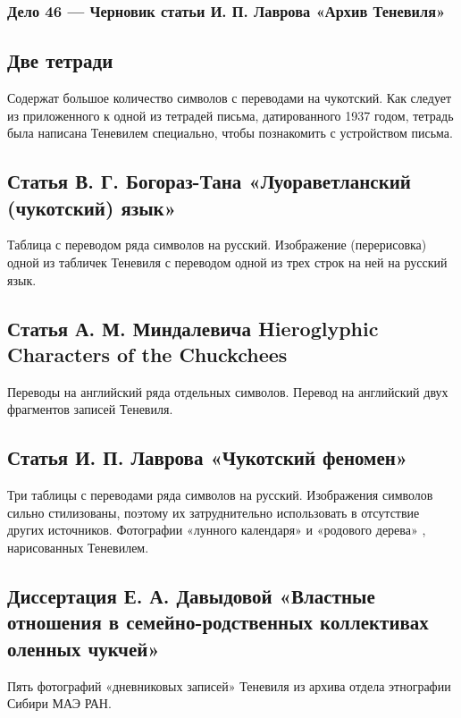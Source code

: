\documentclass{article}
\newcounter{glyph}
\def\allchars{}
\begin{document}
\subsubsection{Дело 46 — Черновик статьи И. П. Лаврова «Архив Теневиля» }

\subsection{Две тетради}

Содержат большое количество символов с переводами на чукотский. Как следует из приложенного к одной из тетрадей письма, датированного 1937 годом, тетрадь была написана Теневилем специально, чтобы познакомить с устройством письма. 

\subsection{Статья В. Г. Богораз-Тана «Луораветланский (чукотский) язык»}

Таблица с переводом ряда символов на русский. Изображение (перерисовка) одной из табличек Теневиля с переводом одной из трех строк на ней на русский язык.

\subsection{Статья А. М. Миндалевича Hieroglyphic Characters of the Chuckchees}

Переводы на английский ряда отдельных символов. Перевод на английский двух фрагментов записей Теневиля.

\subsection{Статья И. П. Лаврова «Чукотский феномен»}

Три таблицы с переводами ряда символов на русский. Изображения символов сильно стилизованы, поэтому их затруднительно использовать в отсутствие других источников. Фотографии «лунного календаря» и «родового дерева» , нарисованных Теневилем.

\subsection{Диссертация Е. А. Давыдовой «Властные отношения в семейно-родственных коллективах оленных чукчей»}

Пять фотографий «дневниковых записей» Теневиля из архива отдела этнографии Сибири МАЭ РАН.

\printbibliography

\end{document}
